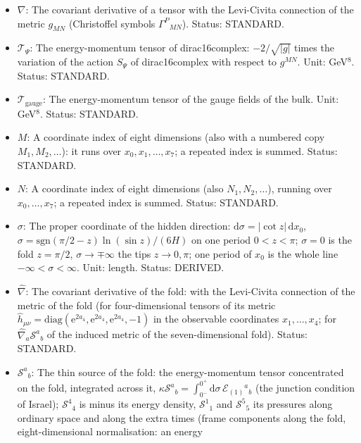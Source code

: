 \documentclass[
  10pt,
]{article}
\providecommand{\tightlist}{%
  \setlength{\itemsep}{0pt}\setlength{\parskip}{0pt}}
\begin{document}
\begin{itemize}
\tightlist
\item
  \(\nabla\): The covariant derivative of a tensor with the Levi-Civita
  connection of the metric \(g_{MN}\) (Christoffel symbols
  \(\Gamma^P{}_{MN}\)). Status: STANDARD.
\item
  \(\mathcal{T}_\Psi\): The energy-momentum tensor of dirac16complex:
  \(-2/\sqrt{\lvert g\rvert}\) times the variation of the action
  \(S_\Psi\) of dirac16complex with respect to \(g^{MN}\). Unit:
  GeV\(^8\). Status: STANDARD.
\item
  \(\mathcal{T}_{\mathrm{gauge}}\): The energy-momentum tensor of the
  gauge fields of the bulk. Unit: GeV\(^8\). Status: STANDARD.
\item
  \(M\): A coordinate index of eight dimensions (also with a numbered
  copy \(M_1, M_2, \dots\)): it runs over \(x_0, x_1, \dots, x_7\); a
  repeated index is summed. Status: STANDARD.
\item
  \(N\): A coordinate index of eight dimensions (also
  \(N_1, N_2, \dots\)), running over \(x_0, \dots, x_7\); a repeated
  index is summed. Status: STANDARD.
\item
  \(\sigma\): The proper coordinate of the hidden direction:
  \(\mathrm{d}\sigma = \lvert\cot z\rvert\,\mathrm{d}x_0\),
  \(\sigma = \mathrm{sgn}(\pi/2 - z)\ln(\sin z)/(6H)\) on one period
  \(0 < z < \pi\); \(\sigma = 0\) is the fold \(z = \pi/2\),
  \(\sigma \to \mp\infty\) the tips \(z \to 0, \pi\); one period of
  \(x_0\) is the whole line \(-\infty < \sigma < \infty\). Unit: length.
  Status: DERIVED.
\item
  \(\hat\nabla\): The covariant derivative of the fold: with the
  Levi-Civita connection of the metric of the fold (for four-dimensional
  tensors of its metric
  \(\hat h_{\mu\nu} = \mathrm{diag}(\mathrm{e}^{2a_4}, \mathrm{e}^{2a_4}, \mathrm{e}^{2a_4}, -1)\)
  in the observable coordinates \(x_1, \dots, x_4\); for
  \(\hat\nabla_a\mathcal{S}^a{}_b\) of the induced metric of the
  seven-dimensional fold). Status: STANDARD.
\item
  \(\mathcal{S}^a{}_b\): The thin source of the fold: the
  energy-momentum tensor concentrated on the fold, integrated across it,
  \(\kappa\mathcal{S}^a{}_b = \int_{0^-}^{0^+}\mathrm{d}\sigma\,\mathcal{E}_{(1)}{}^a{}_b\)
  (the junction condition of Israel); \(\mathcal{S}^4{}_4\) is minus its
  energy density, \(\mathcal{S}^1{}_1\) and \(\mathcal{S}^5{}_5\) its
  pressures along ordinary space and along the extra times (frame
  components along the fold, eight-dimensional normalisation: an energy

\end{itemize}
\end{document}

